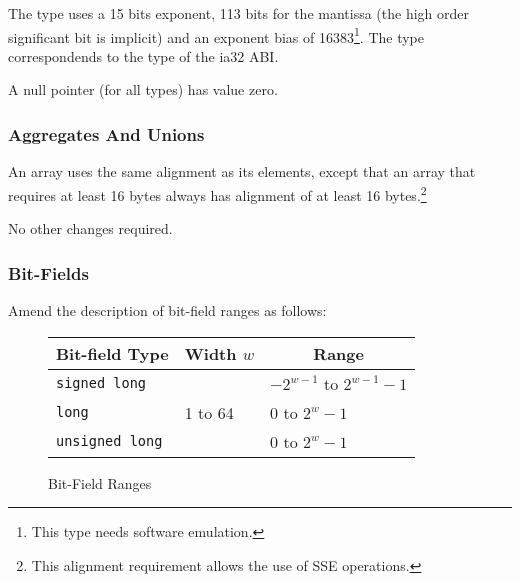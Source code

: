 The  type uses a 15 bits exponent, 113 bits for the
mantissa (the high order significant bit is implicit) and an exponent
bias of 16383\footnote{This type needs software emulation.}.  The
 type correspondends to the  type of
the ia32 ABI.



A null pointer (for all types) has value zero.


\subsubsection{Aggregates And Unions}

An array uses the same alignment as its elements, except that an array
that requires at least 16 bytes always has alignment of at least 16
bytes.\footnote{This alignment requirement allows the use of SSE
  operations.}


No other changes required.

\subsubsection{Bit-Fields}

Amend the description of bit-field ranges as follows:

\begin{figure}[h]
\Hrule
  \caption{Bit-Field Ranges}
  \begin{center}
    \leavevmode
    \begin{tabular}{l|l|l}
      \multicolumn{1}{c}{Bit-field Type} 
         & \multicolumn{1}{c}{Width $w$} 
         & \multicolumn{1}{c}{Range} \\
      \hline
      \texttt{signed long} & & $-2^{w - 1}$ to $2^{w-1}-1$ \\
      \texttt{long} & 1 to 64 & 0 to $2^{w}-1$ \\
      \texttt{unsigned long} & & 0 to $2^{w}-1$ \\
    \end{tabular}
  \end{center}
\Hrule
\end{figure}

